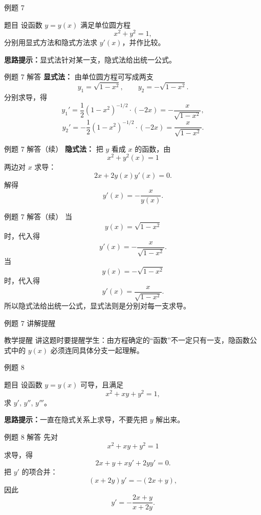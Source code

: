 ﻿\documentclass[aspectratio=169,10pt]{ctexbeamer}
\begin{document}
\begin{frame}[t]{例题 7}
\small
\begin{block}{题目}
设函数 $y=y(x)$ 满足单位圆方程
\[
x^2+y^2=1,
\]
分别用显式方法和隐式方法求 $y'(x)$，并作比较。
\end{block}

\vspace{0.4em}
\textbf{思路提示：}显式法针对某一支，隐式法给出统一公式。
\end{frame}

\begin{frame}[t]{例题 7 解答}
\small
\textbf{显式法：}
由单位圆方程可写成两支
\[
y_1=\sqrt{1-x^2},\qquad y_2=-\sqrt{1-x^2}.
\]
分别求导，得
\[
y_1'=\frac12(1-x^2)^{-1/2}\cdot(-2x)=-\frac{x}{\sqrt{1-x^2}},
\]
\[
y_2'=-\frac12(1-x^2)^{-1/2}\cdot(-2x)=\frac{x}{\sqrt{1-x^2}}.
\]
\end{frame}

\begin{frame}[t]{例题 7 解答（续）}
\small
\textbf{隐式法：}
把 $y$ 看成 $x$ 的函数，由
\[
x^2+y^2(x)=1
\]
两边对 $x$ 求导：
\[
2x+2y(x)y'(x)=0.
\]
解得
\[
\boxed{y'(x)=-\frac{x}{y(x)}.}
\]
\end{frame}

\begin{frame}[t]{例题 7 解答（续）}
\small
当
\[
y(x)=\sqrt{1-x^2}
\]
时，代入得
\[
y'(x)=-\frac{x}{\sqrt{1-x^2}}.
\]
当
\[
y(x)=-\sqrt{1-x^2}
\]
时，代入得
\[
y'(x)=\frac{x}{\sqrt{1-x^2}}.
\]
所以隐式法给出统一公式，显式法则是分别对每一支求导。
\end{frame}

\begin{frame}[t]{例题 7 讲解提醒}
\small
\begin{block}{教学提醒}
讲这题时要提醒学生：由方程确定的“函数”不一定只有一支，隐函数公式中的 $y(x)$ 必须连同具体分支一起理解。
\end{block}
\end{frame}

\begin{frame}[t]{例题 8}
\small
\begin{block}{题目}
设函数 $y=y(x)$ 可导，且满足
\[
x^2+xy+y^2=1,
\]
求 $y'$, $y''$, $y'''$。
\end{block}

\vspace{0.4em}
\textbf{思路提示：}一直在隐式关系上求导，不要先把 $y$ 解出来。
\end{frame}

\begin{frame}[t]{例题 8 解答}
\small
先对
\[
x^2+xy+y^2=1
\]
求导，得
\[
2x+y+xy'+2yy'=0.
\]
把 $y'$ 的项合并：
\[
(x+2y)y'=-(2x+y),
\]
因此
\[
\boxed{y'=-\frac{2x+y}{x+2y}.}
\]
\end{frame}
\end{document}
